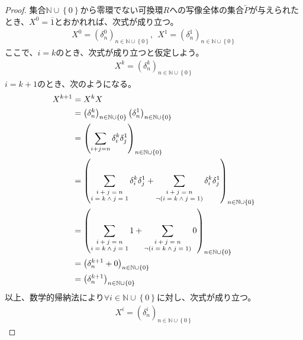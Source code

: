\documentclass[dvipdfmx]{jsarticle}
\begin{document}
\begin{proof}
集合$\mathbb{N} \cup \left\{ 0 \right\}$から零環でない可換環$R$への写像全体の集合$\widetilde{P}$が与えられたとき、$X^{0} = \overline{1}$とおかれれば、次式が成り立つ。
\begin{align*}
X^{0} = \left( \delta_{n}^{0} \right)_{n \in \mathbb{N} \cup \left\{ 0 \right\}},\ \ X^{1} = \left( \delta_{n}^{1} \right)_{n \in \mathbb{N} \cup \left\{ 0 \right\}}
\end{align*}
ここで、$i = k$のとき、次式が成り立つと仮定しよう。
\begin{align*}
X^{k} = \left( \delta_{n}^{k} \right)_{n \in \mathbb{N} \cup \left\{ 0 \right\}}
\end{align*}
$i = k + 1$のとき、次のようになる。
\begin{align*}
X^{k + 1} &= X^{k}X\\
&= \left( \delta_{n}^{k} \right)_{n \in \mathbb{N} \cup \left\{ 0 \right\}}\left( \delta_{n}^{1} \right)_{n \in \mathbb{N} \cup \left\{ 0 \right\}}\\
&= \left( \sum_{i + j = n}  \delta_{i}^{k} \delta_{j}^{1} \right)_{n \in \mathbb{N} \cup \left\{ 0 \right\}}\\
&= \left( \sum_{\scriptsize \begin{matrix} i + j = n \\ i = k \land j = 1 \end{matrix}} \delta_{i}^{k} \delta_{j}^{1} + \sum_{\scriptsize \begin{matrix} i + j = n \\ \neg(i = k \land j = 1) \end{matrix}}  \delta_{i}^{k} \delta_{j}^{1} \right)_{n \in \mathbb{N} \cup \left\{ 0 \right\}}\\
&= \left( \sum_{\scriptsize \begin{matrix} i + j = n \\ i = k \land j = 1 \end{matrix}} 1 + \sum_{\scriptsize \begin{matrix} i + j = n \\ \neg(i = k \land j = 1) \end{matrix}} 0 \right)_{n \in \mathbb{N} \cup \left\{ 0 \right\}}\\
&= \left( \delta_{n}^{k+1} + 0\right)_{n \in \mathbb{N} \cup \left\{ 0 \right\}}\\
&= \left( \delta_{n}^{k+1} \right)_{n \in \mathbb{N} \cup \left\{ 0 \right\}}
\end{align*}
以上、数学的帰納法により$\forall i \in \mathbb{N} \cup \left\{ 0 \right\}$に対し、次式が成り立つ。
\begin{align*}
X^{i} = \left( \delta_{n}^{i} \right)_{n \in \mathbb{N} \cup \left\{ 0 \right\}}
\end{align*}
\end{proof}
\end{document}
